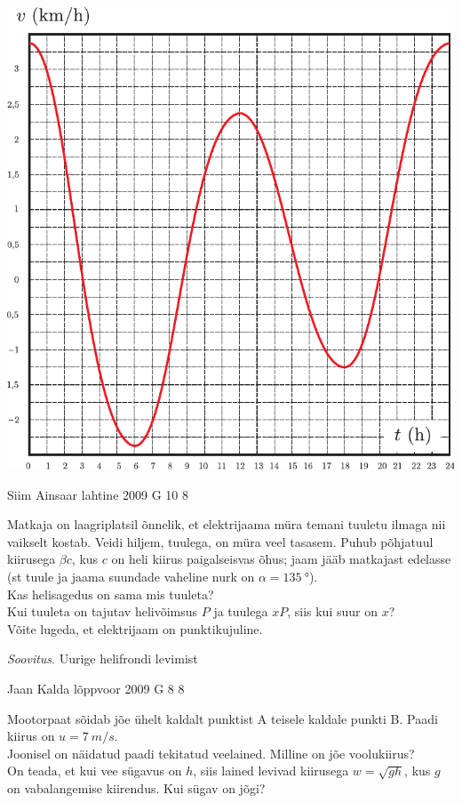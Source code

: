 \documentclass[11pt]{article}
\begin{document}
{{\begin{center}
	\includegraphics[width=0.7\linewidth]{2007-v3g-05-yl}
\end{center}
\fi
}

{Siim Ainsaar} %
{lahtine} %
{2009} %
{G 10} %
{8} %
{
\ifStatement
Matkaja on laagriplatsil õnnelik, et elektrijaama müra temani tuuletu ilmaga nii vaikselt kostab. Veidi hiljem, tuulega, on müra veel tasasem. Puhub põhjatuul kiirusega $\beta c$, kus $c$ on heli kiirus paigalseisvas õhus; jaam jääb matkajast edelasse
(st tuule ja jaama suundade vaheline nurk on $\alpha = \SI{135}{\degree}$).\\
\osa Kas helisagedus on sama mis tuuleta?\\
\osa Kui tuuleta on tajutav helivõimsus $P$ ja tuulega $xP$, siis kui suur on $x$?\\
Võite lugeda, et elektrijaam on punktikujuline. 

\emph{Soovitus}. Uurige helifrondi levimist
\fi
}

{Jaan Kalda} %
{lõppvoor} %
{2009} %
{G 8} %
{8} %
{
\ifStatement
Mootorpaat sõidab jõe ühelt kaldalt punktist A teisele kaldale punkti B. Paadi kiirus on $u=\SI{7}{m/s}$.\\
\osa Joonisel on näidatud paadi tekitatud veelained. Milline on jõe voolukiirus?\\
\osa On teada, et kui vee sügavus on $h$, siis lained levivad kiirusega $w=\sqrt{gh}$, kus $g$ on vabalangemise kiirendus.
Kui sügav on jõgi?

}}
\end{document}
